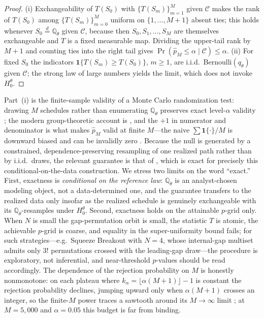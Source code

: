 \begin{proof}
(i) Exchangeability of $T(S_0)$ with $\{T(S_m)\}_{m=1}^{M}$ given $\mathcal C$
makes the rank of $T(S_0)$ among $\{T(S_m)\}_{m=0}^{M}$ uniform on
$\{1,\dots,M+1\}$ absent ties; this holds whenever $S_0\stackrel{d}{=}
\mathbb{Q}_\theta$ given $\mathcal C$, because then $S_0,S_1,\dots,S_M$ are
themselves exchangeable and $T$ is a fixed measurable map. Dividing the
upper-tail rank by $M+1$ and counting ties into the right tail gives
$\Pr(\hat p_M\le\alpha\mid\mathcal C)\le\alpha$. (ii) For fixed $S_0$ the
indicators $\mathbf 1\{T(S_m)\ge T(S_0)\}$, $m\ge1$, are i.i.d.\
Bernoulli$(q_\theta)$ given $\mathcal C$; the strong law of large numbers yields
the limit, which does not invoke $H_0^\theta$.
\end{proof}

Part~(i) is the finite-sample validity of a Monte Carlo randomization test:
drawing $M$ schedules rather than enumerating $\mathbb{Q}_\theta$ preserves exact
level-$\alpha$ validity \cite{Dwass1957,Hope1968}; the modern group-theoretic
account is \cite{HemerikGoeman2018}, and the $+1$ in numerator and denominator is
what makes $\hat p_M$ valid at finite $M$---the naive $\sum\mathbf
1\{\cdot\}/M$ is downward biased and can be invalidly zero
\cite{PhipsonSmyth2010}. Because the null is generated by a constrained,
dependence-preserving resampling of one realized path rather than by i.i.d.\
draws, the relevant guarantee is that of \cite{BesagClifford1989}, which is exact
for precisely this conditional-on-the-data construction. We stress two limits on
the word ``exact.'' First, exactness is \emph{conditional on the reference law}:
$\mathbb{Q}_\theta$ is an analyst-chosen modeling object, not a data-determined
one, and the guarantee transfers to the realized data only insofar as the
realized schedule is genuinely exchangeable with its $\mathbb{Q}_\theta$-resamples
under $H_0^\theta$. Second, exactness holds on the attainable $p$-grid only.
When $N$ is small the gap-permutation orbit is small, the statistic $T$ is
atomic, the achievable $p$-grid is coarse, and equality in the super-uniformity
bound fails; for such strategies---e.g.\ Squeeze Breakout with $N=4$, whose
internal-gap multiset admits only $3!$ permutations crossed with the leading-gap
draw---the procedure is exploratory, not inferential, and near-threshold
$p$-values should be read accordingly. The dependence of the rejection
probability on $M$ is honestly nonmonotone: on each plateau where
$k_\alpha=\lfloor\alpha(M+1)\rfloor-1$ is constant the rejection probability
declines, jumping upward only when $\alpha(M+1)$ crosses an integer, so the
finite-$M$ power traces a sawtooth around its $M\to\infty$ limit
\cite{Hope1968}; at $M=5{,}000$ and $\alpha=0.05$ this budget is far from binding.

